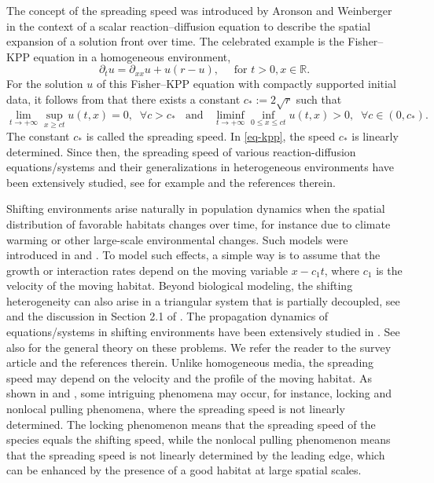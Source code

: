 \documentclass[10pt]{article}
\numberwithin{equation}{section}
\newcommand{\R}{\mathbb{R}}
\begin{document}

The concept of the  spreading speed was  introduced by Aronson and Weinberger \cite{aronson1978multidimensional}  in the context of  a scalar reaction--diffusion equation  to  describe the  spatial expansion of a solution front  over time.   The celebrated example is the   Fisher--KPP  equation in a homogeneous environment,
\begin{equation*}
\partial_{t} u=  \partial_{xx} u + u(r-u),    \quad \text{ for }   t>0, x\in \R.
\end{equation*} 
For the solution $u$ of this  Fisher--KPP  equation  with  compactly supported initial data, it follows from \cite{aronson1978multidimensional}  that there exists a constant $c_*:= 2\sqrt{r}$ such that 
\begin{equation}\label{eq-kpp}
\lim_{t\to +\infty } \sup_{ x \geq ct} u(t,x) =0,  \;\; \forall c>c_* \;\; \text{ and } \;\; \liminf_{t\to +\infty } \inf_{ 0\leq x \leq ct} u(t,x)> 0,  \;\; \forall c\in (0,c_*).  
\end{equation}
The constant $c_*$ is called  the spreading speed.   In \eqref{eq-kpp}, the speed $c_*$   is linearly determined. 
Since then, the  spreading speed of various reaction-diffusion equations/systems and their  generalizations in heterogeneous environments have been extensively studied, see for example  \cite{berestycki2019asymptotic, ducrot2019spreading,  girardin2019invasion} and the  references  therein.     

Shifting environments arise naturally in population dynamics when the spatial distribution of favorable  habitats changes over time, for instance due to  climate warming or other large-scale environmental changes.  Such models   were  introduced  in   \cite{potapov2004shift}  and \cite{berestycki2009shift}.  
 To model such effects, a simple way is to  assume that  the growth or interaction rates depend on the moving variable $x-c_1t$,  where $c_1$ is the velocity of the  moving habitat.   Beyond  biological modeling, the shifting  heterogeneity can also  arise  in a triangular system that  is partially decoupled, see \cite{fang-lou-wu2016,holzer2014accelerated} and the discussion in Section 2.1 of  \cite{GGM2024}.   The  propagation dynamics of equations/systems in shifting environments have been extensively  studied in   \cite{choi2021persistence, fang-lou-wu2016, GGM2024,  LamLee2024pp, LNY2024, LY2022, Libingtuan2014}.  See also \cite{Yi-Zhao2020jfa, Yi-Zhao2026}   for the general theory  on these problems.    We refer the reader to the  survey article \cite{wang2022shiftSurvey} and the references therein.  
 Unlike  homogeneous media,  the spreading speed may  depend on the velocity and the profile of the moving habitat.  As shown in  \cite{berestyckiFang2018,  LY2022} and \cite[Chapter 6]{LamLou2022},   some intriguing  phenomena may occur, for instance, locking and nonlocal pulling phenomena, where the spreading speed is not linearly determined.  
The  locking phenomenon means that the spreading speed of the species equals    the shifting speed, while the nonlocal pulling  phenomenon  means that the spreading speed  is not linearly determined by the leading edge, which  can be enhanced by the presence of a good habitat at large spatial scales.  
\end{document}
